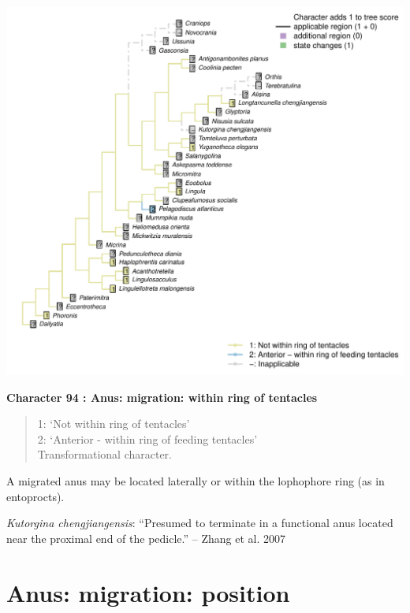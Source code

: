 \documentclass[]{book}
\theoremstyle{definition}
\theoremstyle{definition}
\theoremstyle{definition}
\theoremstyle{remark}
\begin{document}
\includegraphics{Brachiopod_phylogeny_files/figure-latex/unnamed-chunk-5-94.pdf}

\textbf{Character 94 : Anus: migration: within ring of tentacles }

\begin{quote}
1: `Not within ring of tentacles'\\
2: `Anterior - within ring of feeding tentacles'\\
Transformational character.
\end{quote}

A migrated anus may be located laterally or within the lophophore ring
(as in entoprocts).

\emph{Kutorgina chengjiangensis}: ``Presumed to terminate in a
functional anus located near the proximal end of the pedicle.'' -- Zhang
et al. 2007

\hypertarget{anus-migration-position}{%
\section*{Anus: migration: position}\label{anus-migration-position}}
\end{document}
